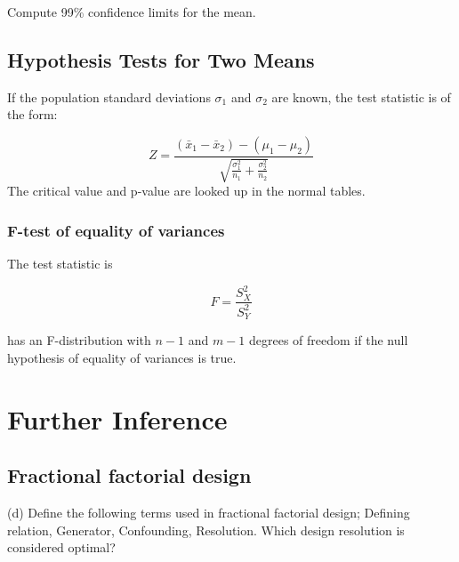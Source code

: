 \documentclass[14pt, a4paper]{article}
\theoremstyle{plain}
\theoremstyle{definition}
\theoremstyle{remark}
\begin{document}
Compute 99\% confidence limits for the mean.
\section{Hypothesis Tests for Two Means}

If the population standard deviations $\sigma_1$ and $\sigma_2$
are known, the test statistic is of the form:

\begin{equation}
Z = \frac{(\bar{x}_1 - \bar{x}_2) - (\mu_1 - \mu_2 ) }{\sqrt{
\frac{\sigma^2_1}{n_1}+\frac{\sigma^2_2}{n_2}} }
\end{equation}
The critical value and p-value are looked up in the normal tables.






\subsection{F-test of equality of variances}
The test statistic is

\begin{equation} F = \frac{S_X^2}{S_Y^2}\end{equation}

has an F-distribution with $n-1$ and $m-1$ degrees of freedom if the null hypothesis of equality of variances is true.


\chapter{Further Inference}

\section{Fractional factorial design}

(d)	Define the following terms used in fractional factorial design; Defining relation,
	Generator, Confounding, Resolution. Which design resolution is considered
	optimal?
\end{document}
